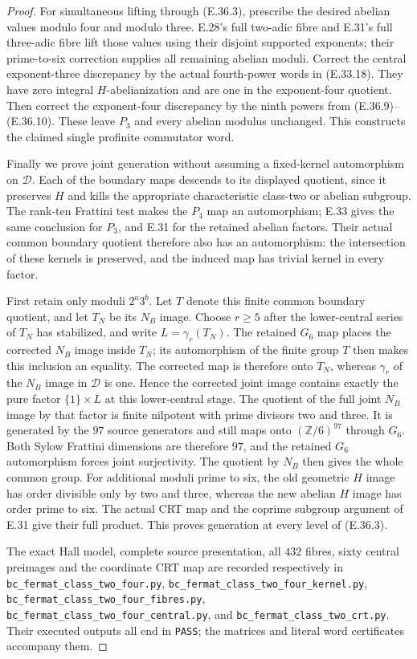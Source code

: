 \begin{proof}
For simultaneous lifting through
\textup{(E.36.3)}, prescribe the desired
abelian values modulo four and modulo three.
E.28's full two-adic fibre and E.31's full
three-adic fibre lift those values using
their disjoint supported exponents; their
prime-to-six correction supplies all remaining
abelian moduli.  Correct the central
exponent-three discrepancy by the actual
fourth-power words in \textup{(E.33.18)}.
They have zero integral $H$-abelianization and
are one in the exponent-four quotient.
Then correct the exponent-four discrepancy
by the ninth powers from
\textup{(E.36.9)--(E.36.10)}.
These leave $P_3$ and every abelian modulus
unchanged.  This constructs the claimed single
profinite commutator word.

Finally we prove joint generation without
assuming a fixed-kernel automorphism on
$\mathscr D$.  Each of the boundary maps
descends to its displayed quotient, since
it preserves $H$ and kills the appropriate
characteristic class-two or abelian subgroup.
The rank-ten Frattini test makes the
$P_4$ map an automorphism; E.33 gives the
same conclusion for $P_3$, and E.31 for
the retained abelian factors.
Their actual common boundary quotient
therefore also has an automorphism:
the intersection of these kernels is
preserved, and the induced map has trivial
kernel in every factor.

First retain only moduli $2^a3^b$.
Let $T$ denote this finite common boundary
quotient, and let $T_N$ be its $N_B$ image.
Choose $r\ge5$ after the lower-central series
of $T_N$ has stabilized, and write
$L=\gamma_r(T_N)$.
The retained $G_6$ map places the corrected
$N_B$ image inside $T_N$; its automorphism
of the finite group $T$ then makes this
inclusion an equality.  The corrected map
is therefore onto $T_N$, whereas
$\gamma_r$ of the $N_B$ image in
$\mathscr D$ is one.  Hence the corrected
joint image contains exactly the pure
factor $\{1\}\times L$ at this lower-central
stage.  The quotient of the full joint
$N_B$ image by that factor is finite
nilpotent with prime divisors two and three.
It is generated by the $97$ source
generators and still maps onto
$(\mathbb Z/6)^{97}$ through $G_6$.
Both Sylow Frattini dimensions are therefore
$97$, and the retained $G_6$ automorphism
forces joint surjectivity.
The quotient by $N_B$ then gives the
whole common group.
For additional moduli prime to six,
the old geometric $H$ image has order
divisible only by two and three, whereas
the new abelian $H$ image has order prime
to six.  The actual CRT map and the
coprime subgroup argument of E.31 give
their full product.  This proves
generation at every level of
\textup{(E.36.3)}.

The exact Hall model, complete source
presentation, all $432$ fibres, sixty
central preimages and the coordinate CRT
map are recorded respectively in
\texttt{bc\_fermat\_class\_two\_four.py},
\texttt{bc\_fermat\_class\_two\_four\_kernel.py},
\texttt{bc\_fermat\_class\_two\_four\_fibres.py},
\texttt{bc\_fermat\_class\_two\_four\_central.py},
and \texttt{bc\_fermat\_class\_two\_crt.py}.
Their executed outputs all end in
\texttt{PASS}; the matrices and literal
word certificates accompany them.
\end{proof}
